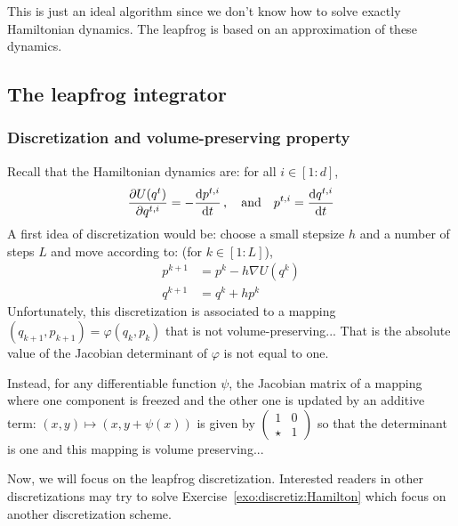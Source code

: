 \documentclass[english,graybox,envcountchap,envcountsame,sectrefs,shortlabels]{svmono}
\theoremstyle{style}
\begin{document}
This is just an ideal algorithm since we don't know how to solve exactly Hamiltonian dynamics. The leapfrog is based on an approximation of these dynamics.


\subsection{The leapfrog integrator}
\subsubsection{Discretization and volume-preserving property}
Recall that the Hamiltonian dynamics are: for all $i \in [1:d]$,
$$
\frac{\partial U(q^t)}{\partial q^{t,i}}=-\frac{\mathrm{d} p^{t,i}}{\mathrm{d} t}\,,  \quad \mbox{and} \quad
p^{t,i}=\frac{\mathrm{d} q^{t,i}}{\mathrm{d} t}
$$
A first idea of discretization would be:  choose a small stepsize $h$ and a number of steps $L$ and move according to: (for $k \in[1:L]$),
\begin{align*}
p^{k+1}&=p^{k}-h \nabla U (q^{k})\\
q^{k+1}&=q^k+h p^{k}
\end{align*}
Unfortunately, this discretization is associated to a mapping $(q_{k+1},p_{k+1})=\varphi(q_k,p_k)$ that is not volume-preserving... That is the absolute value of the Jacobian determinant of $\varphi$ is not equal to one.

Instead, for any differentiable function $\psi$, the Jacobian matrix of a mapping where one component is freezed and the other one is updated by an additive term: $(x,y) \mapsto (x,y+\psi(x))$ is given by $\begin{pmatrix}
1 &0\\
\star & 1
\end{pmatrix}$  so that the determinant is one and this mapping is volume preserving...

Now, we will focus on the leapfrog discretization. Interested readers in other discretizations may try to solve Exercise~\ref{exo:discretiz:Hamilton}  which focus on another discretization scheme.
\end{document}
